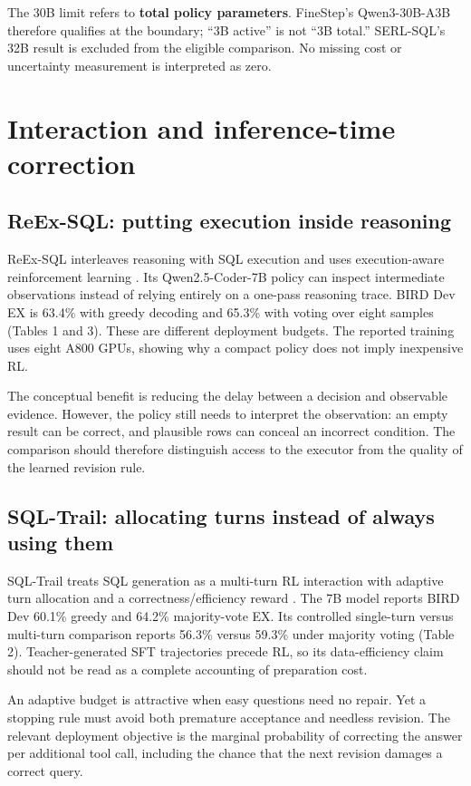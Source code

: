 \documentclass[11pt,a4paper]{article}
\begin{document}
The 30B limit refers to \textbf{total policy parameters}. FineStep's Qwen3-30B-A3B therefore qualifies at the boundary; ``3B active'' is not ``3B total.'' SERL-SQL's 32B result is excluded from the eligible comparison. No missing cost or uncertainty measurement is interpreted as zero.

\clearpage
\section{Interaction and inference-time correction}
\subsection{ReEx-SQL: putting execution inside reasoning}
ReEx-SQL interleaves reasoning with SQL execution and uses execution-aware reinforcement learning \cite{reex}. Its Qwen2.5-Coder-7B policy can inspect intermediate observations instead of relying entirely on a one-pass reasoning trace. BIRD Dev EX is 63.4\% with greedy decoding and 65.3\% with voting over eight samples (Tables 1 and 3). These are different deployment budgets. The reported training uses eight A800 GPUs, showing why a compact policy does not imply inexpensive RL.

The conceptual benefit is reducing the delay between a decision and observable evidence. However, the policy still needs to interpret the observation: an empty result can be correct, and plausible rows can conceal an incorrect condition. The comparison should therefore distinguish access to the executor from the quality of the learned revision rule.

\subsection{SQL-Trail: allocating turns instead of always using them}
SQL-Trail treats SQL generation as a multi-turn RL interaction with adaptive turn allocation and a correctness/efficiency reward \cite{trail}. The 7B model reports BIRD Dev 60.1\% greedy and 64.2\% majority-vote EX. Its controlled single-turn versus multi-turn comparison reports 56.3\% versus 59.3\% under majority voting (Table 2). Teacher-generated SFT trajectories precede RL, so its data-efficiency claim should not be read as a complete accounting of preparation cost.

An adaptive budget is attractive when easy questions need no repair. Yet a stopping rule must avoid both premature acceptance and needless revision. The relevant deployment objective is the marginal probability of correcting the answer per additional tool call, including the chance that the next revision damages a correct query.
\end{document}
